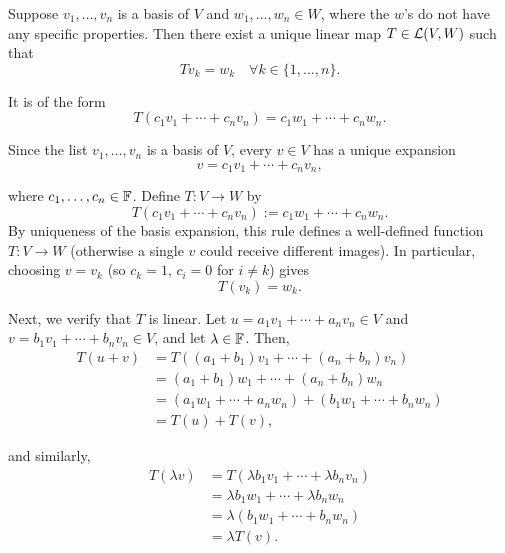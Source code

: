 \setcounter{thm}{3}
\begin{thm}
  \label{thm: linear map lemma}
  Suppose $v_1, \dots, v_n$ is a basis of $V$ and $w_1, \dots, w_n \in W$, where the $w$'s do not have any specific properties. Then there exist a unique linear map $T \in \mathcal{L}(V,W)$ such that
  \begin{equation}
    Tv_{k} = w_k \quad \forall k \in \{1, \dots, n\}.
  \end{equation}

  It is of the form \begin{equation}
    T(c_1 v_1 + \cdots + c_n v_n) = c_1 w_1 + \cdots + c_n w_n.
  \end{equation}
\end{thm}
\begin{prf}
  Since the list $v_1, \dots, v_n$ is a basis of $V$, every $v \in V$ has a unique expansion
  \begin{equation}
    v = c_1 v_1 + \cdots + c_n v_n,
  \end{equation}

  where \( c_1, \dots, c_n \in \mathbb{F} \). Define  $T: V \to W$ by
  \[
    T(c_1 v_1 + \cdots + c_n v_n) := c_1 w_1 + \cdots + c_n w_n.
  \]
  By uniqueness of the basis expansion, this rule defines a well-defined function \(T\colon V\to W\) (otherwise a single \(v\) could receive  different images).
  In particular, choosing \(v=v_k\) (so \(c_k=1\), \(c_i=0\) for \(i\neq k\)) gives
  \[
    T(v_k)=w_k.
  \]

  Next, we verify that \( T \) is linear. Let \( u = a_1 v_1 + \cdots + a_n v_n \in V \) and \( v = b_1 v_1 + \cdots + b_n v_n \in V \), and let \( \lambda \in \mathbb{F} \). Then,
  \begin{align}
    T(u + v) &= T((a_1 + b_1)v_1 + \cdots + (a_n + b_n)v_n) \\
             &= (a_1 + b_1)w_1 + \cdots + (a_n + b_n)w_n \\
             &= (a_1 w_1 + \cdots + a_n w_n) + (b_1 w_1 + \cdots + b_n w_n)  \\
             &= T(u) + T(v),
  \end{align}

  and similarly,
  \begin{align}
    T(\lambda v) &= T(\lambda b_1 v_1 + \cdots + \lambda b_n v_n)  \\
                 &= \lambda b_1 w_1 + \cdots + \lambda b_n w_n  \\
                 &= \lambda (b_1 w_1 + \cdots + b_n w_n) \\
                 &= \lambda T(v).
  \end{align}


\end{prf}
